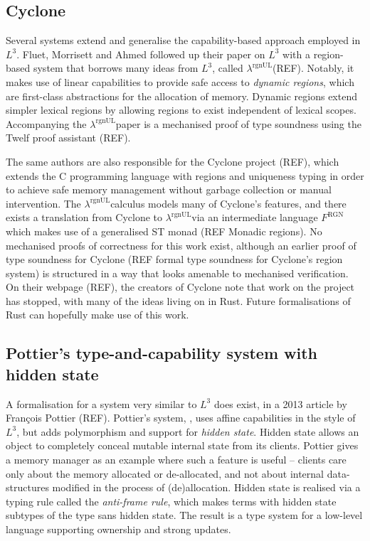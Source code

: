 \documentclass[]{unswthesis}
\newcommand{\rgnUL}{$\lambda^\text{rgnUL}$\text{ }}
\newcommand{\SSPHS}{\text{SSPHS}}
\begin{document}
\subsection{Cyclone}

Several systems extend and generalise the capability-based approach employed in $L^3$. Fluet, Morrisett and Ahmed followed up their paper on $L^3$ with a region-based system that borrows many ideas from $L^3$, called \rgnUL (REF). Notably, it makes use of linear capabilities to provide safe access to \textit{dynamic regions}, which are first-class abstractions for the allocation of memory. Dynamic regions extend simpler lexical regions by allowing regions to exist independent of lexical scopes. Accompanying the \rgnUL paper is a mechanised proof of type soundness using the Twelf proof assistant (REF).

The same authors are also responsible for the Cyclone project (REF), which extends the C programming language with regions and uniqueness typing in order to achieve safe memory management without garbage collection or manual intervention. The \rgnUL calculus models many of Cyclone's features, and there exists a translation from Cyclone to \rgnUL via an intermediate language $F^\text{RGN}$ which makes use of a generalised ST monad (REF Monadic regions). No mechanised proofs of correctness for this work exist, although an earlier proof of type soundness for Cyclone (REF formal type soundness for Cyclone's region system) is structured in a way that looks amenable to mechanised verification. On their webpage (REF), the creators of Cyclone note that work on the project has stopped, with many of the ideas living on in Rust. Future formalisations of Rust can hopefully make use of this work.

\subsection{Pottier's type-and-capability system with hidden state}

A formalisation for a system very similar to $L^3$ does exist, in a 2013 article by Fran\c{c}ois Pottier (REF). Pottier's system, \SSPHS, uses affine capabilities in the style of $L^3$, but adds polymorphism and support for \textit{hidden state}. Hidden state allows an object to completely conceal mutable internal state from its clients. Pottier gives a memory manager as an example where such a feature is useful -- clients care only about the memory allocated or de-allocated, and not about internal data-structures modified in the process of (de)allocation. Hidden state is realised via a typing rule called the \textit{anti-frame rule}, which makes terms with hidden state subtypes of the type sans hidden state. The result is a type system for a low-level language supporting ownership and strong updates.
\end{document}
